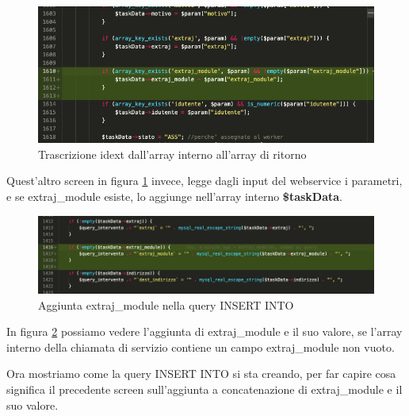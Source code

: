 \newspace
\begin{figure}[!h] 
	\centering
	\includegraphics[scale = 0.5]{immagini/webservices/ampliamenti/2ampl-insert-extraj_mokers__funzione-mokersNewActivity.png}
	\caption{Trascrizione idext dall'array interno all'array di ritorno}
	\label{fig:5-5}
\end{figure}
\newspace
\begin{flushleft}
	
	Quest'altro screen in figura \ref{fig:5-5} invece, legge dagli input del webservice i parametri, e se extraj\_module esiste, lo aggiunge nell'array interno \textbf{\$taskData}.
	
\end{flushleft}
\newspace
\begin{figure}[!h] 
	\centering
	\includegraphics[scale = 0.5]{immagini/webservices/ampliamenti/2ampl_added-extraj_modules-as-query.png}
	\caption{Aggiunta extraj\_module nella query INSERT INTO}
	\label{fig:5-6}
\end{figure}
\newspace

\begin{flushleft}
	In figura \ref{fig:5-6} possiamo vedere l'aggiunta di extraj\_module e il suo valore, se l'array interno della chiamata di servizio contiene un campo extraj\_module non vuoto.
\end{flushleft}

\newpage

\begin{flushleft}
	Ora mostriamo come la query INSERT INTO si sta creando, per far capire cosa significa il precedente screen sull'aggiunta a concatenazione di extraj\_module e il suo valore.
\end{flushleft}

